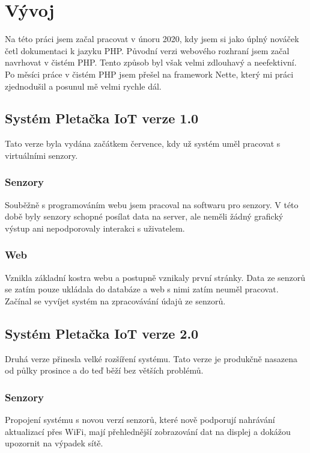 \chapter{Vývoj}
Na této práci jsem začal pracovat v únoru 2020, kdy jsem si jako úplný nováček četl dokumentaci k jazyku PHP. 
Původní verzi webového rozhraní jsem začal navrhovat v čistém PHP. Tento způsob byl však velmi zdlouhavý a neefektivní.
Po měsíci práce v čistém PHP jsem přešel na framework Nette, který mi práci zjednodušil a posunul mě velmi rychle dál. 


\section{Systém Pletačka IoT verze 1.0}
Tato verze byla vydána začátkem července, kdy už systém uměl pracovat s virtuálními senzory.


\subsection{Senzory}
Souběžně s programováním webu jsem pracoval na softwaru pro senzory.
V této době byly senzory schopné posílat data na server, ale neměli žádný grafický výstup ani nepodporovaly interakci s uživatelem.

\subsection{Web}
Vznikla základní kostra webu a postupně vznikaly první stránky.
Data ze senzorů se zatím pouze ukládala do databáze a web s nimi zatím neuměl pracovat.
Začínal se vyvíjet systém na zpracovávání údajů ze senzorů.



\section{Systém Pletačka IoT verze 2.0}
Druhá verze přinesla velké rozšíření systému.
Tato verze je produkčně nasazena od půlky prosince a do teď běží bez větších problémů.


\subsection{Senzory}
Propojení systému s novou verzí senzorů, které nově podporují nahrávání aktualizací přes WiFi, mají přehlednější zobrazování dat na displej a dokážou upozornit na výpadek sítě.



